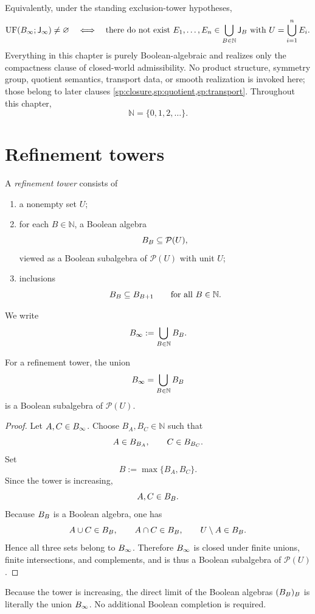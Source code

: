 Equivalently, under the standing exclusion-tower hypotheses,
\[
		\operatorname{UF}(B_\infty;\mathsf J_\infty)\neq\varnothing
		\quad\Longleftrightarrow\quad
		\text{there do not exist }E_1,\dots,E_n\in\bigcup_{B\in\mathbb N}\mathsf J_B
		\text{ with }U=\bigcup_{i=1}^n E_i.
\]
Everything in this chapter is purely Boolean-algebraic and realizes only
the compactness clause of closed-world admissibility.
No product structure, symmetry group, quotient semantics, transport
data, or smooth realization is invoked here; those belong to later
clauses \cref{sp:closure,sp:quotient,sp:transport}.
\medskip
Throughout this chapter,
\[
	\mathbb N=\{0,1,2,\dots\}.
\]
\section{Refinement towers}
\begin{definition}
	A \emph{refinement tower} consists of
	\begin{enumerate}[label=\textup{(\arabic*)}]
		\item a nonempty set \(U\);
		\item for each \(B\in\mathbb N\), a Boolean algebra
		      \[
			      B_B\subseteq \mathcal P(U),
		      \]
		      viewed as a Boolean subalgebra of \(\mathcal P(U)\) with unit \(U\);
		\item inclusions
		      \[
			      B_B\subseteq B_{B+1}
			      \qquad
			      \text{for all }B\in\mathbb N.
		      \]
	\end{enumerate}
\end{definition}
We write
\[
	B_\infty:=\bigcup_{B\in\mathbb N}B_B.
\]
\begin{lemma}
	For a refinement tower, the union
	\[
		B_\infty=\bigcup_{B\in\mathbb N}B_B
	\]
	is a Boolean subalgebra of \(\mathcal P(U)\).
\end{lemma}
\begin{proof}
	Let \(A,C\in B_\infty\). Choose \(B_A,B_C\in\mathbb N\) such that
	\[
		A\in B_{B_A},
		\qquad
		C\in B_{B_C}.
	\]
	Set
	\[
		B:=\max\{B_A,B_C\}.
	\]
	Since the tower is increasing,
	\[
		A,C\in B_B.
	\]
	Because \(B_B\) is a Boolean algebra, one has
	\[
		A\cup C\in B_B,
		\qquad
		A\cap C\in B_B,
		\qquad
		U\setminus A\in B_B.
	\]
	Hence all three sets belong to \(B_\infty\). Therefore \(B_\infty\) is
	closed under finite unions, finite intersections, and complements, and is
	thus a Boolean subalgebra of \(\mathcal P(U)\).
\end{proof}
\begin{remark}
	Because the tower is increasing, the direct limit of the Boolean algebras
	\((B_B)_B\) is literally the union \(B_\infty\). No additional Boolean
	completion is required.
\end{remark}
